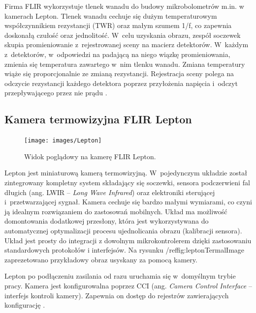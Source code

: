 Firma FLIR wykorzystuje tlenek wanadu do budowy mikrobolometrów m.in. w kamerach Lepton. 
Tlenek wanadu cechuje się dużym temperaturowym współczynnikiem rezystancji (TWR) oraz małym szumem 1/f, co zapewnia doskonałą czułość oraz jednolitość. 
W~celu uzyskania obrazu, zespół soczewek skupia promieniowanie z~rejestrowanej sceny na macierz detektorów. 
W~każdym z~detektorów, w~odpowiedzi na padającą na niego wiązkę promieniowania, zmienia się temperatura zawartego w~nim tlenku wanadu. 
Zmiana temperatury wiąże się proporcjonalnie ze zmianą rezystancji. 
Rejestracja sceny polega na odczycie rezystancji każdego detektora poprzez przyłożenia napięcia i~odczyt przepływającego przez nie prądu \cite{flir:lepton}.


\subsection{Kamera termowizyjna FLIR Lepton}
\begin{figure}[h]
\centering
\texttt{[image: images/Lepton]}
\caption{Widok poglądowy na kamerę FLIR Lepton.}
\label{fig:lepton}
\end{figure}

Lepton jest miniaturową kamerą termowizyjną. 
W~pojedynczym układzie został zintegrowany kompletny system składający się soczewki, sensora podczerwieni fal długich (ang. LWIR -- \textit{Long Wave Infrared}) oraz elektroniki sterującej i~przetwarzającej sygnał.
Kamera cechuje się bardzo małymi wymiarami, co czyni ją idealnym rozwiązaniem do zastosowań mobilnych.
Układ ma możliwość domontowania dodatkowej przesłony, która jest wykorzystywana do automatycznej optymalizacji procesu ujednolicania obrazu (kalibracji sensora).
Układ jest prosty do integracji z dowolnym mikrokontrolerem dzięki zastosowaniu standardowych protokołów i interfejsów. Na rysunku /ref{fig:leptonTermalImage} zaprezetowano przykładowy obraz usyskany za pomocą kamery.

Lepton po podłączeniu zasilania od razu uruchamia się w~domyślnym trybie pracy. 
Kamera jest konfigurowalna poprzez CCI (ang. \textit{Camera Control Interface} – interfejs kontroli kamery).
Zapewnia on dostęp do rejestrów zawierających konfigurację \cite{lepton}. 

